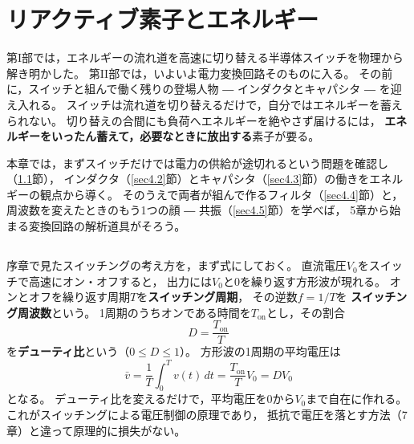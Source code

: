 \chapter{リアクティブ素子とエネルギー}
\label{chap4}

第I部では，エネルギーの流れ道を高速に切り替える半導体スイッチを物理から解き明かした。
第II部では，いよいよ電力変換回路そのものに入る。
その前に，スイッチと組んで働く残りの登場人物 ― インダクタとキャパシタ ― を迎え入れる。
スイッチは流れ道を切り替えるだけで，自分ではエネルギーを蓄えられない。
切り替えの合間にも負荷へエネルギーを絶やさず届けるには，
\textbf{エネルギーをいったん蓄えて，必要なときに放出する}素子が要る。

本章では，まずスイッチだけでは電力の供給が途切れるという問題を確認し（\ref{sec4.1}節），
インダクタ（\ref{sec4.2}節）とキャパシタ（\ref{sec4.3}節）の働きをエネルギーの観点から導く。
そのうえで両者が組んで作るフィルタ（\ref{sec4.4}節）と，
周波数を変えたときのもう1つの顔 ― 共振（\ref{sec4.5}節）を学べば，
5章から始まる変換回路の解析道具がそろう。

\section{}
\label{sec4.1}

\subsection{}

序章で見たスイッチングの考え方を，まず式にしておく。
直流電圧$V_0$をスイッチで高速にオン・オフすると，
出力には$V_0$と$0$を繰り返す方形波が現れる。
オンとオフを繰り返す周期$T$を\textbf{スイッチング周期}，
その逆数$f = 1/T$を
\textbf{スイッチング周波数}という。
1周期のうちオンである時間を$T_{\mathrm{on}}$とし，その割合
\begin{equation}
D = \frac{T_{\mathrm{on}}}{T}
\label{eq4.1}
\end{equation}
を\textbf{デューティ比}という（$0 \le D \le 1$）。
方形波の1周期の平均電圧は
\begin{equation}
\bar{v} = \frac{1}{T}\int_0^{T} v(t)\,dt = \frac{T_{\mathrm{on}}}{T}V_0 = DV_0
\label{eq4.2}
\end{equation}
となる。
デューティ比を変えるだけで，平均電圧を$0$から$V_0$まで自在に作れる。
これがスイッチングによる電圧制御の原理であり，
抵抗で電圧を落とす方法（7章）と違って原理的に損失がない。

